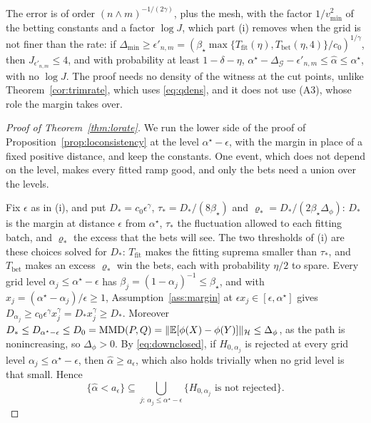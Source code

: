 The error is of order $(n\wedge m)^{-1/(2\gamma)}$, plus the mesh, with the factor $1/v^2_{\min}$ of the betting
constants and a factor $\log J$, which part (i) removes when the grid is not finer than the rate: if $\Delta_{\min}\ge\epsilon'_{n,m}=(\beta_\star\max\{T_{\mathrm{fit}}(\eta),T_{\mathrm{bet}}(\eta,4)\}/c_0)^{1/\gamma}$,
then $J_{\epsilon'_{n,m}}\le4$, and with probability at least $1-\delta-\eta$,
$\alpha^\star-\Delta_{\mathcal G}-\epsilon'_{n,m}\le\widehat\alpha\le\alpha^\star$, with no $\log J$. The proof needs no
density of the witness at the cut points, unlike Theorem~\ref{cor:trimrate}, which uses \eqref{eq:qdens}, and it does
not use (A3), whose role the margin takes over.

\begin{proof}[Proof of Theorem~\ref{thm:lorate}]
We run the lower side of the proof of Proposition~\ref{prop:loconsistency} at the level $\alpha^\star-\epsilon$, with the
margin in place of a fixed positive distance, and keep the constants. One event, which does not depend on the level,
makes every fitted ramp good, and only the bets need a union over the levels.

Fix $\epsilon$ as in (i), and put $D_*=c_0\epsilon^\gamma$, $\tau_*=D_*/(8\beta_\star)$ and
$\varrho_*=D_*/(2\beta_\star\Delta_\phi)$: $D_*$ is the margin at distance $\epsilon$ from $\alpha^\star$, $\tau_*$ the
fluctuation allowed to each fitting batch, and $\varrho_*$ the excess that the bets will see. The two thresholds of
(i) are these choices solved for $D_*$: $T_{\mathrm{fit}}$ makes the fitting suprema smaller than $\tau_*$, and
$T_{\mathrm{bet}}$ makes an excess $\varrho_*$ win the bets, each with probability $\eta/2$ to spare. Every grid level $\alpha_j\le\alpha^\star-\epsilon$ has
$\beta_j=(1-\alpha_j)^{-1}\le\beta_\star$, and with $x_j=(\alpha^\star-\alpha_j)/\epsilon\ge1$,
Assumption~\ref{ass:margin} at $\epsilon x_j\in[\epsilon,\alpha^\star]$ gives
$D_{\alpha_j}\ge c_0\epsilon^\gamma x_j^\gamma=D_*x_j^\gamma\ge D_*$. Moreover $D_*\le D_{\alpha^\star-\epsilon}\le
D_0=\operatorname{MMD}(P,Q)=\|\mathbb{E}[\phi(X)-\phi(Y)]\|_{\mathcal{H}}\le\Delta_\phi$, as the path is nonincreasing, so $\Delta_\phi>0$. By
\eqref{eq:downclosed}, if $H_{0,\alpha_j}$ is rejected at every grid level $\alpha_j\le\alpha^\star-\epsilon$, then
$\widehat\alpha\ge a_\epsilon$, which also holds trivially when no grid level is that small. Hence
\[
\{\widehat\alpha<a_\epsilon\}\subseteq\bigcup_{j:\,\alpha_j\le\alpha^\star-\epsilon}
\{H_{0,\alpha_j}\text{ is not rejected}\}.
\]


\end{proof}
